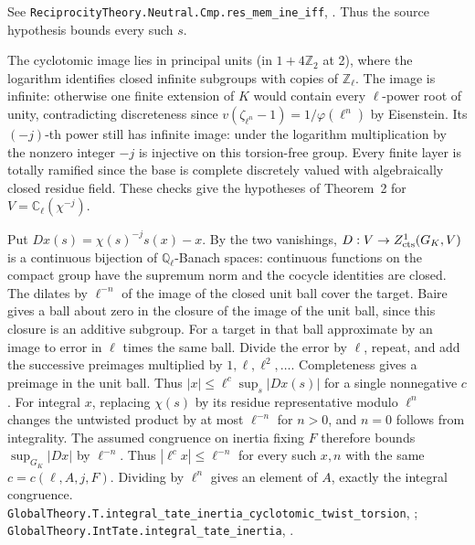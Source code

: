 See \nolinkurl{ReciprocityTheory.Neutral.Cmp.res_mem_ine_iff}, . Thus the source hypothesis bounds every such \(s\).
\par The cyclotomic image lies in principal units (in \(1+4\mathbb Z_2\)
at 2), where the logarithm identifies closed infinite subgroups
with copies of \(\mathbb Z_\ell\). The image is infinite: otherwise one finite
extension of \(K\) would contain every \(\ell\)-power root of unity,
contradicting discreteness since
\(v(\zeta_{\ell^n}-1)=1/\varphi(\ell^n)\) by Eisenstein. Its
\((-j)\)-th power still has infinite image: under the logarithm multiplication by the nonzero integer \(-j\) is injective on this torsion-free group.
Every finite layer is totally ramified since the base is complete
discretely valued with algebraically closed residue field. These checks
give the hypotheses of Theorem~2 for \(V=\mathbb C_\ell(\chi^{-j})\).
\par Put \(Dx(s)=\chi(s)^{-j}s(x)-x\). By the two vanishings,
\(D:V\to Z^1_{\rm cts}(G_K,V)\) is a continuous bijection of
\(\mathbb Q_\ell\)-Banach spaces: continuous functions on the compact
group have the supremum norm and the cocycle identities are closed.
The dilates by \(\ell^{-n}\) of the image of the closed unit ball cover
the target. Baire gives a ball about zero in the closure of the image
of the unit ball, since this closure is an additive subgroup. For a
target in that ball approximate by an image to error in \(\ell\)
times the same ball. Divide the error by \(\ell\), repeat, and add
the successive preimages multiplied by \(1,\ell,\ell^2,\ldots\).
Completeness gives a preimage in the unit ball. Thus
\(|x|\le\ell^c\sup_s |Dx(s)|\) for a single nonnegative \(c\).
For integral \(x\), replacing \(\chi(s)\) by its residue representative
modulo \(\ell^n\) changes the untwisted product by at most \(\ell^{-n}\)
for \(n>0\), and \(n=0\) follows from integrality. The assumed congruence on inertia fixing \(F\) therefore bounds \(\sup_{G_K}|Dx|\) by \(\ell^{-n}\).
Thus \(|\ell^c x|\le \ell^{-n}\) for every such \(x,n\) with the same \(c=c(\ell,A,j,F)\). Dividing by \(\ell^n\) gives an element of \(A\), exactly the integral congruence.
\nolinkurl{GlobalTheory.T.integral_tate_inertia_cyclotomic_twist_torsion},
;
\nolinkurl{GlobalTheory.IntTate.integral_tate_inertia},
.

